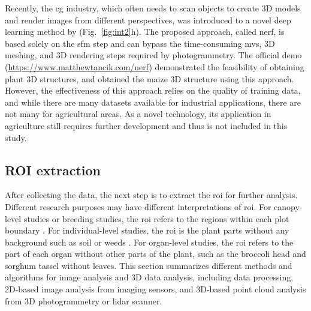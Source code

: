 

Recently, the \gls{cg} industry, which often needs to scan objects to create 3D models and render images from different perspectives, was introduced to a novel deep learning method by \citet{mildenhall_nerf_2022} (Fig.~\ref{fig:int2}h). The proposed approach, called \gls{nerf}, is based solely on the \gls{sfm} step and can bypass the time-consuming \gls{mvs}, 3D meshing, and 3D rendering steps required by photogrammetry. The official demo (\url{https://www.matthewtancik.com/nerf}) demonstrated the feasibility of obtaining plant 3D structures, and \citet{jignasu_plant_2023} obtained the maize 3D structure using this approach. However, the effectiveness of this approach relies on the quality of training data, and while there are many datasets available for industrial applications, there are not many for agricultural areas. As a novel technology, its application in agriculture still requires further development and thus is not included in this study.



\subsection{ROI extraction}

After collecting the data, the next step is to extract the \acrfull{roi} for further analysis. Different research purposes may have different interpretations of \gls{roi}. For canopy-level studies or breeding studies, the \gls{roi} refers to the regions within each plot boundary \citep{trevisan_htp_2020,han_drone_2021}. For individual-level studies, the \gls{roi} is the plant parts without any background such as soil or weeds \citep{ge_method_2019,guo_fieldbased_2020}. For organ-level studies, the \gls{roi} refers to the part of each organ without other parts of the plant, such as the broccoli head \citep{zhou_monitoring_2020} and sorghum tassel \citep{ghosal_weakly_2019} without leaves. This section summarizes different methods and algorithms for image analysis and 3D data analysis, including data processing, 2D-based image analysis from imaging sensors, and 3D-based point cloud analysis from 3D photogrammetry or \gls{lidar} scanner.

